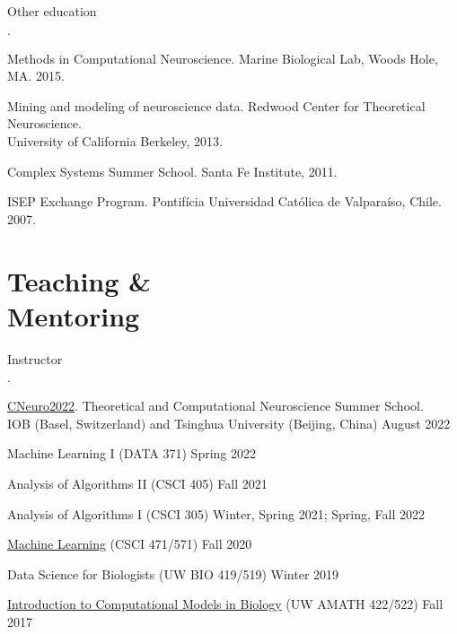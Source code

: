 \documentclass[margin,line]{res}
\newenvironment{list1}{
  \begin{list}{$\cdot$}{%
      \setlength{\itemsep}{0in}
      \setlength{\parsep}{0in} \setlength{\parskip}{0in}
      \setlength{\topsep}{0in} \setlength{\partopsep}{0in} 
      \setlength{\leftmargin}{0.17in}}}{\end{list}}
\begin{document}
\begin{resume}
  Other education
  \begin{list1}
  \item Methods in Computational Neuroscience. Marine Biological Lab, Woods Hole, MA. 2015.
  \item  Mining and modeling of neuroscience data. 
    Redwood Center for Theoretical Neuroscience. \\
    University of California Berkeley, 2013.
  \item Complex Systems Summer School. Santa Fe Institute, 2011.
  \item ISEP Exchange Program. 
    Pontif\'{i}cia Universidad Cat\'{o}lica de Valpara\'{i}so, Chile. 2007.
  \end{list1}

  \section{\sc Teaching \&\\Mentoring}

  Instructor
  \begin{list1}
  \item \href{https://www.cneuro.net/cneuro2022}{CNeuro2022}.
    Theoretical and Computational Neuroscience Summer School.\\
    IOB (Basel, Switzerland) and Tsinghua University (Beijing, China)
    \hfill
    August 2022
  \item Machine Learning I (DATA 371) \hfill Spring 2022
  \item Analysis of Algorithms II (CSCI 405) \hfill Fall 2021
  \item Analysis of Algorithms I (CSCI 305)
    \hfill Winter, Spring 2021; Spring, Fall 2022
  \item \href{https://glomerul.us/teaching/CSCI-471/2020-Fall/}{Machine Learning}
    (CSCI 471/571) \hfill Fall 2020
  \item Data Science for Biologists (UW BIO 419/519) \hfill Winter 2019
  \item \href{https://glomerul.us/teaching/422-522/}
    {Introduction to Computational Models in Biology} (UW AMATH 422/522) 
    \hfill Fall 2017
  \end{list1}


\end{resume}
\end{document}
